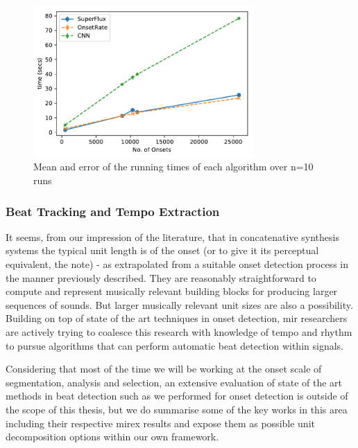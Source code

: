 {\begin{figure}
	\begin{center}
		\includegraphics[width=0.75\textwidth]{ch05_pyconcat/figures/onset_running_times.pdf}
	\end{center}
	\caption[Mean and error of the running times of each algorithm over n=10 runs]{Mean and error of the running times of each algorithm over n=10 runs}
	\label{fig:onset_running_times}
\end{figure}

\subsubsection{Beat Tracking and Tempo Extraction}

It seems, from our impression of the literature, that in concatenative synthesis systems the typical unit length is of the onset (or to give it its perceptual equivalent, the note)  \citep{Schwarz2006, Frisson2010, Bernardes2013} - as extrapolated from a suitable onset detection process in the manner previously described. They are reasonably straightforward to compute and represent musically relevant building blocks for producing larger sequences of sounds. But larger musically relevant unit sizes are also a possibility.  Building on top of state of the art techniques in onset detection, \acrshort{mir} researchers are actively trying to coalesce this research with knowledge of tempo and rhythm to pursue algorithms that can perform automatic beat detection within signals.

Considering that most of the time we will be working at the onset scale of segmentation, analysis and selection, an extensive evaluation of state of the art methods in beat detection such as we performed for onset detection is outside of the scope of this thesis, but we do summarise some of the key works in this area including their respective \acrshort{mirex} results and expose them as possible unit decomposition options within our own framework. 

}
